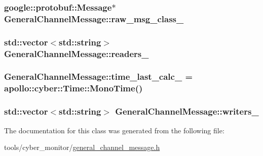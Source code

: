 \hypertarget{classGeneralChannelMessage_ab150e16ccbb7e536a0b6e6276e3eca7a}{
\subsubsection[{raw\-\_\-msg\-\_\-class\-\_\-}]{\setlength{\rightskip}{0pt plus 5cm}google\-::protobuf\-::\-Message$\ast$ General\-Channel\-Message\-::raw\-\_\-msg\-\_\-class\-\_\-\hspace{0.3cm}{\ttfamily [private]}}}\label{classGeneralChannelMessage_ab150e16ccbb7e536a0b6e6276e3eca7a}
\hypertarget{classGeneralChannelMessage_a2839fca91027887bdb8c7e9df077c105}{
\subsubsection[{readers\-\_\-}]{\setlength{\rightskip}{0pt plus 5cm}std\-::vector$<$std\-::string$>$ General\-Channel\-Message\-::readers\-\_\-\hspace{0.3cm}{\ttfamily [private]}}}\label{classGeneralChannelMessage_a2839fca91027887bdb8c7e9df077c105}
\hypertarget{classGeneralChannelMessage_ad1f7f60900caf4cc8cfba0fb83961a43}{
\subsubsection[{time\-\_\-last\-\_\-calc\-\_\-}]{ General\-Channel\-Message\-::time\-\_\-last\-\_\-calc\-\_\- = {\bf apollo\-::cyber\-::\-Time\-::\-Mono\-Time}()\hspace{0.3cm}{\ttfamily [private]}}}\label{classGeneralChannelMessage_ad1f7f60900caf4cc8cfba0fb83961a43}
\hypertarget{classGeneralChannelMessage_aff8aed1cdbd9bfebcea0b2bb5f5c6c5b}{
\subsubsection[{writers\-\_\-}]{\setlength{\rightskip}{0pt plus 5cm}std\-::vector$<$std\-::string$>$ General\-Channel\-Message\-::writers\-\_\-\hspace{0.3cm}{\ttfamily [private]}}}\label{classGeneralChannelMessage_aff8aed1cdbd9bfebcea0b2bb5f5c6c5b}


The documentation for this class was generated from the following file\-:\begin{DoxyCompactItemize}
\item 
tools/cyber\-\_\-monitor/\hyperlink{general__channel__message_8h}{general\-\_\-channel\-\_\-message.\-h}\end{DoxyCompactItemize}

